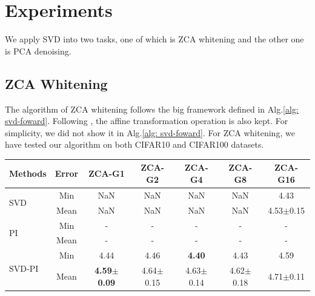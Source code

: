 \section{Experiments}
We apply SVD into two tasks, one of which is ZCA whitening and the other one is PCA denoising.
\subsection{ZCA Whitening}

The algorithm of ZCA whitening follows the big framework defined in Alg.\ref{alg: svd-foward}.
Following \cite{huang2018decorrelated}, the affine transformation operation is also kept. For simplicity, we did not show it in Alg.\ref{alg: svd-foward}.
For ZCA whitening, we have tested our algorithm on both CIFAR10 and CIFAR100 datasets.

\begin{table}[!htb]
\begin{tabular}{|l|c|c|c|c|c|c|}
\hline
Methods                 & Error & ZCA-G1                 & ZCA-G2        & ZCA-G4        & ZCA-G8        & ZCA-G16       \\ \hline
\multirow{2}{*}{SVD}    & Min   & NaN                    & NaN           & NaN           & NaN           & 4.43             \\ \cline{2-7} 
                        & Mean  & NaN                    & NaN           & NaN           & NaN           & 4.53$\pm$0.15         \\ \hline
\multirow{2}{*}{PI}     & Min   & -                      & -             & -             & -             & -             \\ \cline{2-7} 
                        & Mean  & -                      & -             & -             & -             & -             \\ \hline
\multirow{2}{*}{SVD-PI} & Min   & 4.44                   & 4.46          & \textbf{4.40} & 4.43          & 4.59          \\ \cline{2-7} 
                        & Mean  & \textbf{4.59$\pm$0.09} & 4.64$\pm$0.15 & 4.63$\pm$0.14 & 4.62$\pm$0.18 & 4.71$\pm$0.11 \\ \hline
\end{tabular}
\end{table}


